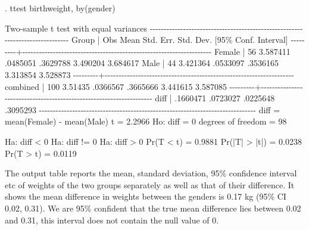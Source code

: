 \documentclass[
]{memoir}
\newenvironment{Shaded}{\begin{snugshade}}{\end{snugshade}}
\newcommand{\NormalTok}[1]{#1}
\begin{document}
\begin{Shaded}
\begin{Highlighting}[]
\NormalTok{. ttest birthweight, by(gender)}

\NormalTok{Two{-}sample t test with equal variances}
\NormalTok{{-}{-}{-}{-}{-}{-}{-}{-}{-}{-}{-}{-}{-}{-}{-}{-}{-}{-}{-}{-}{-}{-}{-}{-}{-}{-}{-}{-}{-}{-}{-}{-}{-}{-}{-}{-}{-}{-}{-}{-}{-}{-}{-}{-}{-}{-}{-}{-}{-}{-}{-}{-}{-}{-}{-}{-}{-}{-}{-}{-}{-}{-}{-}{-}{-}{-}{-}{-}{-}{-}{-}{-}{-}{-}{-}{-}{-}{-}}
\NormalTok{   Group |     Obs        Mean    Std. Err.   Std. Dev.   [95\% Conf. Interval]}
\NormalTok{{-}{-}{-}{-}{-}{-}{-}{-}{-}+{-}{-}{-}{-}{-}{-}{-}{-}{-}{-}{-}{-}{-}{-}{-}{-}{-}{-}{-}{-}{-}{-}{-}{-}{-}{-}{-}{-}{-}{-}{-}{-}{-}{-}{-}{-}{-}{-}{-}{-}{-}{-}{-}{-}{-}{-}{-}{-}{-}{-}{-}{-}{-}{-}{-}{-}{-}{-}{-}{-}{-}{-}{-}{-}{-}{-}{-}{-}}
\NormalTok{  Female |      56    3.587411    .0485051    .3629788    3.490204    3.684617}
\NormalTok{    Male |      44    3.421364    .0533097    .3536165    3.313854    3.528873}
\NormalTok{{-}{-}{-}{-}{-}{-}{-}{-}{-}+{-}{-}{-}{-}{-}{-}{-}{-}{-}{-}{-}{-}{-}{-}{-}{-}{-}{-}{-}{-}{-}{-}{-}{-}{-}{-}{-}{-}{-}{-}{-}{-}{-}{-}{-}{-}{-}{-}{-}{-}{-}{-}{-}{-}{-}{-}{-}{-}{-}{-}{-}{-}{-}{-}{-}{-}{-}{-}{-}{-}{-}{-}{-}{-}{-}{-}{-}{-}}
\NormalTok{combined |     100     3.51435    .0366567    .3665666    3.441615    3.587085}
\NormalTok{{-}{-}{-}{-}{-}{-}{-}{-}{-}+{-}{-}{-}{-}{-}{-}{-}{-}{-}{-}{-}{-}{-}{-}{-}{-}{-}{-}{-}{-}{-}{-}{-}{-}{-}{-}{-}{-}{-}{-}{-}{-}{-}{-}{-}{-}{-}{-}{-}{-}{-}{-}{-}{-}{-}{-}{-}{-}{-}{-}{-}{-}{-}{-}{-}{-}{-}{-}{-}{-}{-}{-}{-}{-}{-}{-}{-}{-}}
\NormalTok{    diff |            .1660471    .0723027                .0225648    .3095293}
\NormalTok{{-}{-}{-}{-}{-}{-}{-}{-}{-}{-}{-}{-}{-}{-}{-}{-}{-}{-}{-}{-}{-}{-}{-}{-}{-}{-}{-}{-}{-}{-}{-}{-}{-}{-}{-}{-}{-}{-}{-}{-}{-}{-}{-}{-}{-}{-}{-}{-}{-}{-}{-}{-}{-}{-}{-}{-}{-}{-}{-}{-}{-}{-}{-}{-}{-}{-}{-}{-}{-}{-}{-}{-}{-}{-}{-}{-}{-}{-}}
\NormalTok{    diff = mean(Female) {-} mean(Male)                              t =   2.2966}
\NormalTok{Ho: diff = 0                                     degrees of freedom =       98}

\NormalTok{    Ha: diff \textless{} 0                 Ha: diff != 0                 Ha: diff \textgreater{} 0}
\NormalTok{ Pr(T \textless{} t) = 0.9881         Pr(|T| \textgreater{} |t|) = 0.0238          Pr(T \textgreater{} t) = 0.0119}
\end{Highlighting}
\end{Shaded}

The output table reports the mean, standard deviation, 95\% confidence interval etc of weights of the two groups separately as well as that of their difference. It shows the mean difference in weights between the genders is 0.17 kg (95\% CI 0.02, 0.31). We are 95\% confident that the true mean difference lies between 0.02 and 0.31, this interval does not contain the null value of 0.
\end{document}
